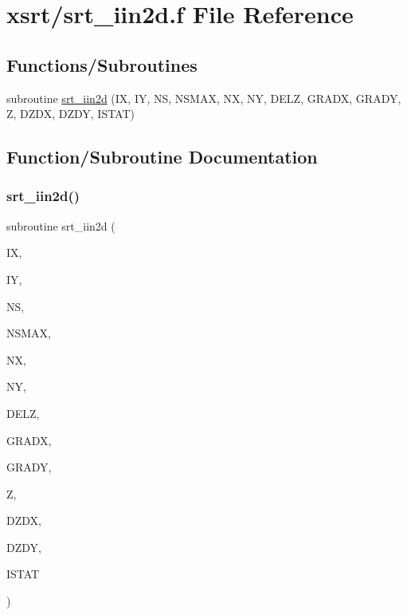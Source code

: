 \hypertarget{srt__iin2d_8f}{}\section{xsrt/srt\+\_\+iin2d.f File Reference}
\label{srt__iin2d_8f}
\subsection*{Functions/\+Subroutines}
\begin{DoxyCompactItemize}
\item 
subroutine \hyperlink{srt__iin2d_8f_a8ff05bc55393c0ccb63097a57d5354d7}{srt\+\_\+iin2d} (IX, IY, NS, N\+S\+M\+AX, NX, NY, D\+E\+LZ, G\+R\+A\+DX, G\+R\+A\+DY, Z, D\+Z\+DX, D\+Z\+DY, I\+S\+T\+AT)
\end{DoxyCompactItemize}


\subsection{Function/\+Subroutine Documentation}
\mbox{\label{srt__iin2d_8f_a8ff05bc55393c0ccb63097a57d5354d7}} 
\subsubsection{\texorpdfstring{srt\+\_\+iin2d()}{srt\_iin2d()}}
{\footnotesize\ttfamily subroutine srt\+\_\+iin2d (\begin{DoxyParamCaption}\item[{integer}]{IX,  }\item[{integer}]{IY,  }\item[{integer}]{NS,  }\item[{integer}]{N\+S\+M\+AX,  }\item[{integer}]{NX,  }\item[{integer}]{NY,  }\item[{double precision, dimension(nx,ny,nsmax)}]{D\+E\+LZ,  }\item[{double precision, dimension(nx,ny,nsmax)}]{G\+R\+A\+DX,  }\item[{double precision, dimension(nx,ny,nsmax)}]{G\+R\+A\+DY,  }\item[{double precision}]{Z,  }\item[{double precision}]{D\+Z\+DX,  }\item[{double precision}]{D\+Z\+DY,  }\item[{integer}]{I\+S\+T\+AT }\end{DoxyParamCaption})}

